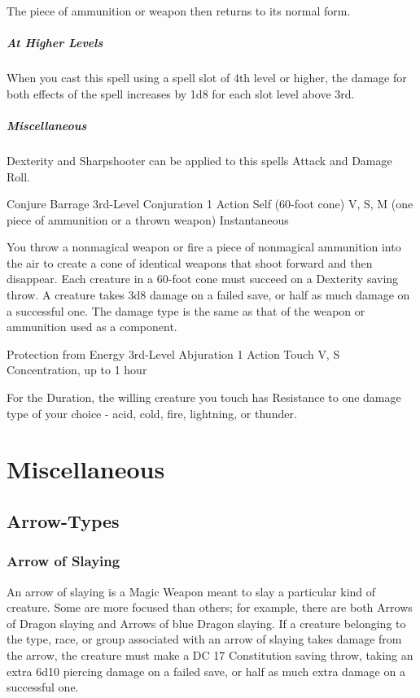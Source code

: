 \documentclass[letterpaper,openany,oneside,twocolumn]{book}
\begin{document}
The piece of ammunition or weapon then returns to its normal form. 

\subparagraph*{At Higher Levels} When you cast this spell using a spell slot of 4th level or higher, the damage for both effects of the spell increases by 1d8 for each slot level above 3rd.

\subparagraph*{Miscellaneous} Dexterity and Sharpshooter can be applied to this spells Attack and Damage Roll.

\DndSpellHeader
  {Conjure Barrage}
  {3rd-Level Conjuration}
  {1 Action}
  {Self (60-foot cone)}
  {V, S, M (one piece of ammunition or a thrown weapon)}
  {Instantaneous}

You throw a nonmagical weapon or fire a piece of nonmagical ammunition into the air to create a cone of identical weapons that shoot forward and then disappear. Each creature in a 60-foot cone must succeed on a Dexterity saving throw. A creature takes 3d8 damage on a failed save, or half as much damage on a successful one. The damage type is the same as that of the weapon or ammunition used as a component.

\DndSpellHeader
  {Protection from Energy}
  {3rd-Level Abjuration}
  {1 Action}
  {Touch}
  {V, S}
  {Concentration, up to 1 hour}
  
For the Duration, the willing creature you touch has Resistance to one damage type of your choice - acid, cold, fire, lightning, or thunder.


\section*{Miscellaneous}

\subsection*{Arrow-Types}
\subsubsection*{Arrow of Slaying}
An arrow of slaying is a Magic Weapon meant to slay a particular kind of creature. Some are more focused than others; for example, there are both Arrows of Dragon slaying and Arrows of blue Dragon slaying. If a creature belonging to the type, race, or group associated with an arrow of slaying takes damage from the arrow, the creature must make a DC 17 Constitution saving throw, taking an extra 6d10 piercing damage on a failed save, or half as much extra damage on a successful one.
\end{document}
